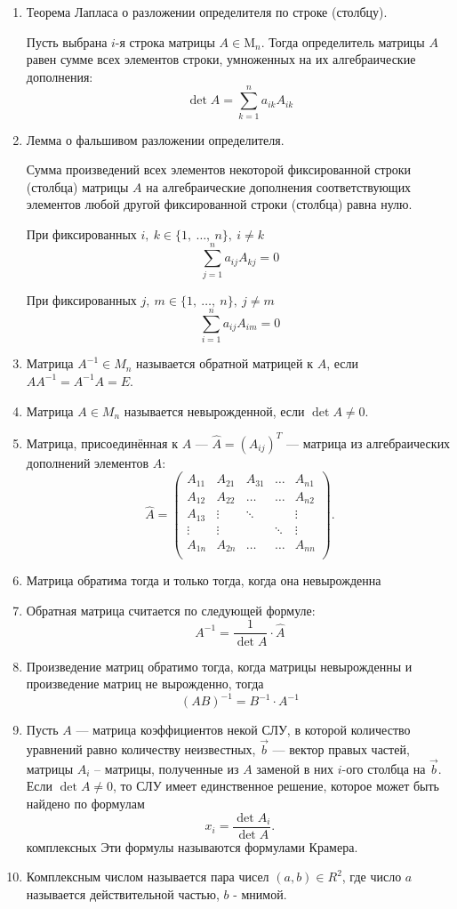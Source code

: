 \documentclass[a4paper,12pt]{article}
\begin{document}
\begin{enumerate}
		\item Теорема Лапласа о разложении определителя по строке (столбцу).
		
		Пусть выбрана $i$-я строка матрицы $A \in \mathrm{M}_n$. Тогда определитель матрицы $A$ равен сумме всех элементов строки, умноженных на их алгебраические дополнения:
		\[\det{A} = \sum_{k = 1}^{n} a_{ik}A_{ik}\]
		
		\item Лемма о фальшивом разложении определителя.
		
		Сумма произведений всех элементов некоторой фиксированной строки (столбца) матрицы $A$ на алгебраические дополнения соответствующих элементов любой другой фиксированной строки (столбца) равна нулю.
		
		При фиксированных $i,\ k \in \{1,\ \ldots,\ n\},\ i \ne k$
		$$ \sum_{j=1}^n a_{ij} A_{kj} = 0 $$
		
		При фиксированных $j,\ m \in \{1,\ \ldots,\ n\},\ j \ne m$
		$$ \sum_{i=1}^n a_{ij} A_{im} = 0 $$
		
		\item Матрица $A^{-1} \in M_n$ называется обратной матрицей к $A$, если $AA^{-1} = A^{-1}A = E$.
		
		
		\item Матрица $A \in M_n$ называется невырожденной, если $\det A \ne 0$. 
		
		\item Матрица, присоединённая к $A$ — $\hat{A} = (A_{ij})^T$ — матрица из алгебраических дополнений элементов $A$: 
		\[\hat A = \begin{pmatrix}
		A_{11} & A_{21} & A_{31} & \ldots & A_{n1} \\
		A_{12} & A_{22} & \ldots & \ldots & A_{n2} \\
		A_{13} & \vdots & \ddots &  & \vdots \\
		\vdots & \vdots &  & \ddots & \vdots \\
		A_{1n} & A_{2n} & \ldots & \ldots & A_{nn} \\
		\end{pmatrix}.\]
		
		\item Матрица обратима тогда и только тогда, когда она невырожденна
	
		\item Обратная матрица считается по следующей формуле:
		$$A^{-1} = \displaystyle\frac{1}{\det A} \cdot \hat{A}$$
		\item Произведение матриц обратимо тогда, когда матрицы невырожденны и произведение матриц не вырожденно, тогда
		\[
		(AB)^{-1} = B^{-1}\cdot A^{-1}
		\]
		\item Пусть $A$ — матрица коэффициентов некой СЛУ, в которой количество уравнений равно количеству неизвестных, $\vec b$ — вектор правых частей, матрицы $A_i$ -- матрицы, полученные из $A$ заменой в них $i$-ого столбца на $\vec b$. Если $\det A \not= 0$, то СЛУ имеет единственное решение, которое может быть найдено по формулам 
		$$
		x_i = \frac{\det A_i}{\det A}.
		$$ комплексных
		Эти формулы называются формулами Крамера.
		\item Комплексным числом называется пара чисел $(a, b) \in R^2$, где число $a$ называется действительной частью, $b$ - мнимой.
		

\end{enumerate}
\end{document}
